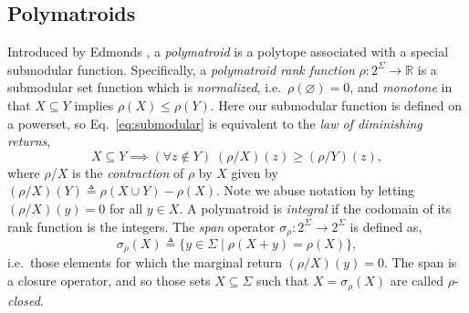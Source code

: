 \documentclass[11pt]{article}
\newcommand{\univ}{\Sigma}
\begin{document}
\subsection{Polymatroids}
Introduced by Edmonds \cite{edmonds2003submodular}, a \emph{polymatroid} is a polytope associated with a special submodular function.
Specifically, a \emph{polymatroid rank function} $\rho:2^\univ\to\mathbb{R}$ is a submodular set function which is \emph{normalized}, i.e.\ $\rho(\varnothing) = 0$, and \emph{monotone} in that $X \subseteq Y$ implies $\rho(X) \leq \rho(Y)$.
Here our submodular function is defined on a powerset, so Eq.~\ref{eq:submodular} is equivalent to the \emph{law of diminishing returns},
\[
    X \subseteq Y \implies (\forall z \notin Y)\;(\rho/X)(z) \geq (\rho/Y)(z),
\]
where $\rho/X$ is the \emph{contraction} of $\rho$ by $X$ given by $(\rho/X)(Y)\triangleq \rho(X \cup Y) - \rho(X).$
Note we abuse notation by letting $(\rho/X)(y) = 0$ for all $y \in X$.
A polymatroid is \emph{integral} if the codomain of its rank function is the integers. 
The \emph{span} operator $\sigma_\rho:2^\univ\to 2^\univ$ is defined as,
\begin{equation}\label{eq:pm-span-def}\sigma_\rho(X) \triangleq\{y \in \univ\mid \rho(X + y) = \rho(X)\},\end{equation}
i.e.\ those elements for which the marginal return $(\rho/X)(y) = 0$. 
The span is a closure operator, and so those sets $X \subseteq \univ$ such that $X = \sigma_\rho(X)$ are called $\rho$-\emph{closed}.
\end{document}
